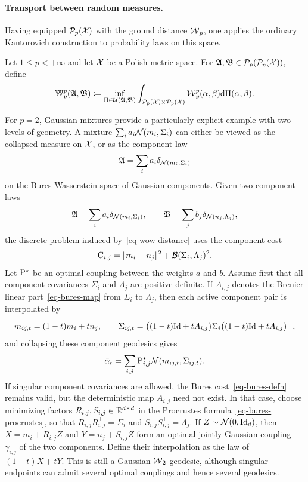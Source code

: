 \paragraph{Transport between random measures.}
Having equipped $\Pp_p(\X)$ with the ground distance $\Wass_p$, one applies the ordinary Kantorovich construction to probability laws on this space.
\begin{defn}\label{def-wasserstein-over-wasserstein}
Let $1\leq p<+\infty$ and let $\X$ be a Polish metric space. For $\mathfrak A,\mathfrak B\in\Pp_p(\Pp_p(\X))$, define
\begin{equation}\label{eq-wow-distance}
	\mathbb W_p^p(\mathfrak A,\mathfrak B)
	\eqdef
	\inf_{\Pi\in\Couplings(\mathfrak A,\mathfrak B)}
	\int_{\Pp_p(\X)\times\Pp_p(\X)}
	\Wass_p^p(\alpha,\beta)\d\Pi(\alpha,\beta).
\end{equation}
\end{defn}
For $p=2$, Gaussian mixtures provide a particularly explicit example with two levels of geometry. A mixture
$\sum_i a_i\Gaussian(m_i,\Sigma_i)$ can either be viewed as the collapsed measure on $\X$, or as the component law
\[
	\mathfrak A=\sum_i a_i\delta_{\Gaussian(m_i,\Sigma_i)}
\]
on the Bures-Wasserstein space of Gaussian components. Given two component laws
\[
	\mathfrak A=\sum_i a_i\delta_{\Gaussian(m_i,\Sigma_i)},
	\qquad
	\mathfrak B=\sum_j b_j\delta_{\Gaussian(n_j,\Lambda_j)},
\]
the discrete problem induced by~\eqref{eq-wow-distance} uses the component cost
\[
	\C_{i,j}=\norm{m_i-n_j}^2+\Bb(\Sigma_i,\Lambda_j)^2.
\]
Let $\P^\star$ be an optimal coupling between the weights $a$ and $b$. Assume first that all component covariances $\Sigma_i$ and $\Lambda_j$ are positive definite. If $A_{i,j}$ denotes the Brenier linear part~\eqref{eq-bures-map} from $\Sigma_i$ to $\Lambda_j$, then each active component pair is interpolated by
\[
	m_{ij,t}=(1-t)m_i+t n_j,
	\qquad
	\Sigma_{ij,t}
	=
	\big((1-t)\Id+tA_{i,j}\big)\Sigma_i
	\big((1-t)\Id+tA_{i,j}\big)^\top,
\]
and collapsing these component geodesics gives
\[
	\bar\alpha_t=
	\sum_{i,j}\P^\star_{i,j}\Gaussian(m_{ij,t},\Sigma_{ij,t}).
\]
If singular component covariances are allowed, the Bures cost~\eqref{eq-bures-defn} remains valid, but the deterministic map $A_{i,j}$ need not exist. In that case, choose minimizing factors $R_{i,j},S_{i,j}\in\RR^{d\times d}$ in the Procrustes formula~\eqref{eq-bures-procrustes}, so that $R_{i,j}R_{i,j}^{\top}=\Sigma_i$ and $S_{i,j}S_{i,j}^{\top}=\Lambda_j$. If $Z\sim\Gaussian(0,\Id_d)$, then $X=m_i+R_{i,j}Z$ and $Y=n_j+S_{i,j}Z$ form an optimal jointly Gaussian coupling $\gamma_{i,j}$ of the two components. Define their interpolation as the law of $(1-t)X+tY$. This is still a Gaussian $\Wass_2$ geodesic, although singular endpoints can admit several optimal couplings and hence several geodesics.

